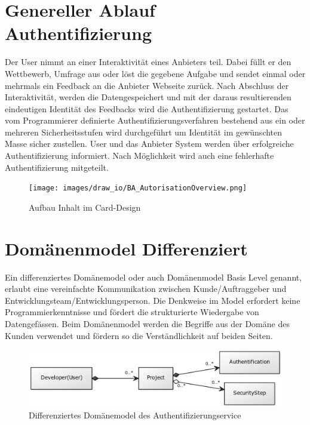 \subsection{}\label{section}

\newpage

\section{Genereller Ablauf
Authentifizierung}\label{genereller-ablauf-authentifizierung}

Der User nimmt an einer Interaktivität eines Anbieters teil. Dabei füllt
er den Wettbewerb, Umfrage aus oder löst die gegebene Aufgabe und sendet
einmal oder mehrmals ein Feedback an die Anbieter Webseite zurück. Nach
Abschluss der Interaktivität, werden die Datengespeichert und mit der
daraus resultierenden eindeutigen Identität des Feedbacks wird die
Authentifizierung gestartet. Das vom Programmierer definierte
Authentifizierungsverfahren bestehend aus ein oder mehreren
Sicherheitsstufen wird durchgeführt um Identität im gewünschten Masse
sicher zustellen. User und das Anbieter System werden über erfolgreiche
Authentifizierung informiert. Nach Möglichkeit wird auch eine
fehlerhafte Authentifizierung mitgeteilt.

\begin{figure}[htbp]
\centering
\texttt{[image: images/draw\_io/BA\_AutorisationOverview.png]}
\caption{Aufbau Inhalt im Card-Design}
\end{figure}

\section{Domänenmodel
Differenziert}\label{domuxe4nenmodel-differenziert}

Ein differenziertes Domänemodel oder auch Domänenmodel Basis Level
genannt, erlaubt eine vereinfachte Kommunikation zwischen
Kunde/Auftraggeber und Entwicklungsteam/Entwicklungsperson. Die
Denkweise im Model erfordert keine Programmierkenntnisse und fördert die
strukturierte Wiedergabe von Datengefässen. Beim Domänenmodel werden die
Begriffe aus der Domäne des Kunden verwendet und fördern so die
Verständlichkeit auf beiden Seiten.

\begin{figure}[htbp]
\centering
\includegraphics{images/domaenenmodell.png}
\caption{Differenziertes Domänemodel des Authentifizierungservice}
\end{figure}

